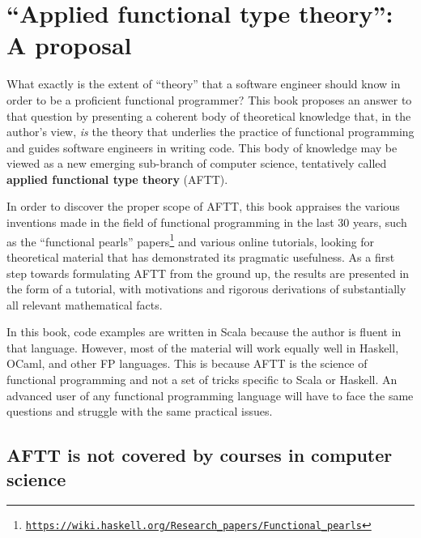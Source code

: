 
\chapter{\textquotedblleft Applied functional type theory\textquotedblright :
A proposal\label{chap:Applied-functional-type}}

What exactly is the extent of \textsf{``}theory\textsf{''} that a software engineer
should know in order to be a proficient functional programmer? This
book proposes an answer to that question by presenting a coherent
body of theoretical knowledge that, in the author\textsf{'}s view, \emph{is}
the theory that underlies the practice of functional programming and
guides software engineers in writing code. This body of knowledge
may be viewed as a new emerging sub-branch of computer science, tentatively
called \textbf{applied functional
type theory} (AFTT). 

In order to discover the proper scope of AFTT, this book appraises
the various inventions made in the field of functional programming
in the last 30 years, such as the \textquotedblleft functional pearls\textquotedblright{}
papers\footnote{\texttt{\href{https://wiki.haskell.org/Research_papers/Functional_pearls}{https://wiki.haskell.org/Research\_papers/Functional\_pearls}}}
and various online tutorials, looking for theoretical material that
has demonstrated its pragmatic usefulness. As a first step towards
formulating AFTT from the ground up, the results are presented in
the form of a tutorial, with motivations and rigorous derivations
of substantially all relevant mathematical facts.

In this book, code examples are written in Scala because the author
is fluent in that language. However, most of the material will work
equally well in Haskell, OCaml, and other FP languages. This is because
AFTT is the science of functional programming and not a set of tricks
specific to Scala or Haskell. An advanced user of any functional programming
language will have to face the same questions and struggle with the
same practical issues.

\section{AFTT is not covered by courses in computer science}


